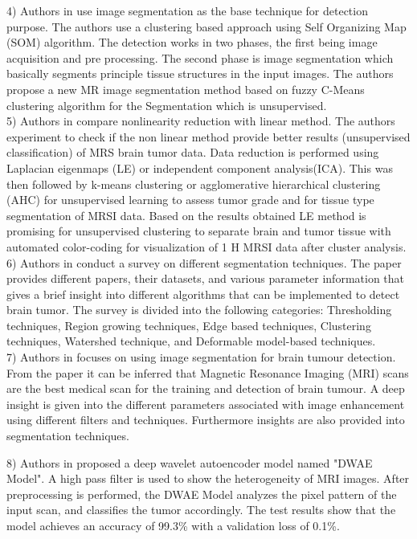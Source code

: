 4) Authors in \cite{ref5} use image segmentation as the base technique for detection purpose. The authors use a clustering based approach using Self Organizing Map (SOM) algorithm. The detection works in two phases, the first being image acquisition and pre processing. The second phase is image segmentation which basically segments principle tissue structures in the input images. The authors propose a new MR image segmentation method based on fuzzy C-Means clustering algorithm for the Segmentation which is unsupervised. \\

5) Authors in \cite{ref6} compare nonlinearity reduction with linear method. The authors experiment to check if the non linear method provide better results (unsupervised classification) of MRS brain tumor data. Data reduction is performed using Laplacian eigenmaps (LE) or independent component analysis(ICA). This was then followed by k-means clustering or agglomerative hierarchical clustering (AHC) for unsupervised learning to assess tumor grade and for tissue type segmentation of MRSI data. Based on the results obtained LE method is promising for unsupervised clustering to separate brain and tumor tissue with automated color-coding for visualization of 1 H MRSI data after cluster analysis.\\

6) Authors in \cite{ref7} conduct a survey on different segmentation techniques. The paper provides different papers, their datasets, and various parameter information that gives a brief insight into different algorithms that can be implemented to detect brain tumor. The survey is divided into the following categories: Thresholding techniques, Region growing techniques, Edge based techniques, Clustering techniques, Watershed technique, and Deformable model-based techniques.\\

7) Authors in \cite{ref8} focuses on using image segmentation for brain tumour detection. From the paper it can be inferred that Magnetic Resonance Imaging (MRI) scans are the best medical scan for the training and detection of brain tumour. A deep insight is given into the different parameters associated with image enhancement using different filters and techniques. Furthermore insights are also provided into segmentation techniques.

8) Authors in \cite{ref9} proposed a deep wavelet autoencoder model named "DWAE Model". A high pass filter is used to show the heterogeneity of MRI images. After preprocessing is performed,  the DWAE Model analyzes the pixel pattern of the input scan, and classifies the tumor accordingly. The test results show that the model achieves an accuracy of 99.3\% with a validation loss of 0.1\%.